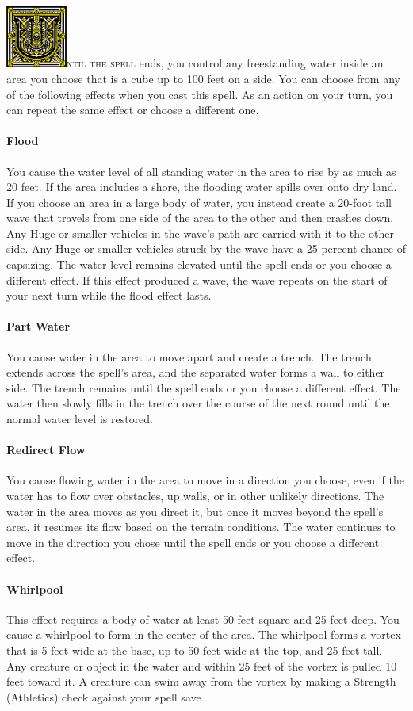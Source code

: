 \documentclass[12pt,showtrims]{memoir}
\begin{document}
\vspace{1\baselineskip}\noindent
\lettrine[lines=4]{\includegraphics[height=58pt]{initials/U.png}}{ntil the spell} ends, you control any freestanding water inside an area you choose that is a cube up to 100 feet on a side. You can choose from any of the following effects when you cast this spell. As an action on your turn, you can repeat the same effect or choose a different one. \paragraph{Flood} You cause the water level of all standing water in the area to rise by as much as 20 feet. If the area includes a shore, the flooding water spills over onto dry land. If you choose an area in a large body of water, you instead create a 20-foot tall wave that travels from one side of the area to the other and then crashes down. Any Huge or smaller vehicles in the wave's path are carried with it to the other side. Any Huge or smaller vehicles struck by the wave have a 25 percent chance of capsizing. The water level remains elevated until the spell ends or you choose a different effect. If this effect produced a wave, the wave repeats on the start of your next turn while the flood effect lasts. \paragraph{Part Water} You cause water in the area to move apart and create a trench. The trench extends across the spell's area, and the separated water forms a wall to either side. The trench remains until the spell ends or you choose a different effect. The water then slowly fills in the trench over the course of the next round until the normal water level is restored. \paragraph{Redirect Flow} You cause flowing water in the area to move in a direction you choose, even if the water has to flow over obstacles, up walls, or in other unlikely directions. The water in the area moves as you direct it, but once it moves beyond the spell's area, it resumes its flow based on the terrain conditions. The water continues to move in the direction you chose until the spell ends or you choose a different effect. \paragraph{Whirlpool} This effect requires a body of water at least 50 feet square and 25 feet deep. You cause a whirlpool to form in the center of the area. The whirlpool forms a vortex that is 5 feet wide at the base, up to 50 feet wide at the top, and 25 feet tall. Any creature or object in the water and within 25 feet of the vortex is pulled 10 feet toward it. A creature can swim away from the vortex by making a Strength (Athletics) check against your spell save 
\end{document}
